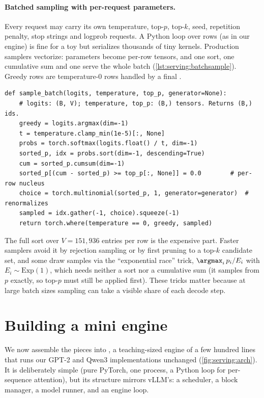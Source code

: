 \paragraph{Batched sampling with per-request parameters.} Every request may carry its own temperature,
top-$p$, top-$k$, seed, repetition penalty, stop strings and logprob requests. A Python loop over rows (as in our
engine) is fine for a toy but serializes thousands of tiny kernels. Production samplers vectorize: parameters
become per-row tensors, and one sort, one cumulative sum and one  serve the whole batch
(\cref{lst:serving:batchsample}). Greedy rows are temperature-0 rows handled by a final .

\begin{lstlisting}[caption={Vectorized sampling with per-row temperature and top-p.},label={lst:serving:batchsample}]
def sample_batch(logits, temperature, top_p, generator=None):
    # logits: (B, V); temperature, top_p: (B,) tensors. Returns (B,) ids.
    greedy = logits.argmax(dim=-1)
    t = temperature.clamp_min(1e-5)[:, None]
    probs = torch.softmax(logits.float() / t, dim=-1)
    sorted_p, idx = probs.sort(dim=-1, descending=True)
    cum = sorted_p.cumsum(dim=-1)
    sorted_p[(cum - sorted_p) >= top_p[:, None]] = 0.0        # per-row nucleus
    choice = torch.multinomial(sorted_p, 1, generator=generator)  # renormalizes
    sampled = idx.gather(-1, choice).squeeze(-1)
    return torch.where(temperature == 0, greedy, sampled)
\end{lstlisting}

The full sort over $V=151{,}936$ entries per row is the expensive part. Faster samplers avoid it by
rejection sampling or by first pruning to a top-$k$ candidate set, and some draw samples via the
``exponential race'' trick, $\argmax_i\, p_i/E_i$ with $E_i\sim\text{Exp}(1)$, which needs neither a sort
nor a cumulative sum (it samples from $p$ exactly, so top-$p$ must still be applied first). These tricks
matter because at large batch sizes sampling can take a visible share of each decode step.

\section{Building a mini engine}\label{sec:serving:engine}

We now assemble the pieces into , a teaching-sized engine of a few hundred lines
that runs our GPT-2 and Qwen3 implementations unchanged (\cref{fig:serving:arch}). It is deliberately
simple (pure PyTorch, one process, a Python loop for per-sequence attention), but its structure mirrors
vLLM's: a scheduler, a block manager, a model runner, and an engine loop.

